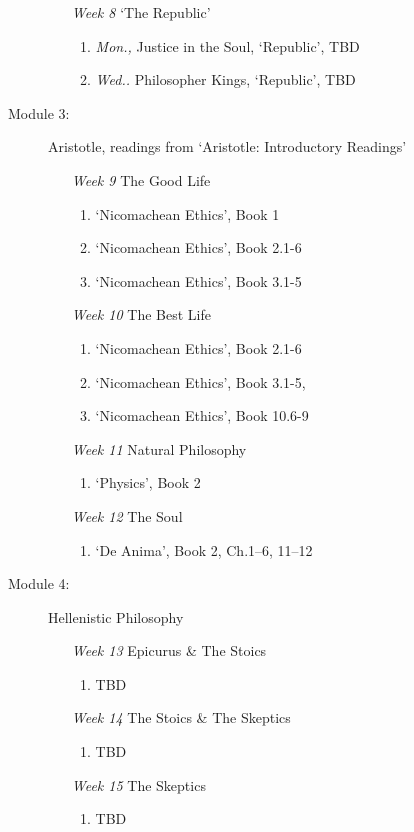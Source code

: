 \documentclass[article,oneside]{memoir}
\begin{document}
\begin{description}
\begin{enumerate}
\item[\textit{Week 8}] `The Republic'
\begin{enumerate}
\item \emph{Mon.,} Justice in the Soul, `Republic', TBD %
\item \emph{Wed..} Philosopher Kings, `Republic', TBD
\end{enumerate}
\end{enumerate}

\item[Module 3:] Aristotle, readings from `Aristotle: Introductory Readings'
\begin{enumerate}
\item[\textit{Week 9}]  The Good Life
\begin{enumerate}
\item `Nicomachean Ethics', Book 1
\item `Nicomachean Ethics', Book 2.1-6
\item `Nicomachean Ethics', Book 3.1-5 

\end{enumerate}
\item[\textit{Week 10}] The Best Life
\begin{enumerate}
\item `Nicomachean Ethics', Book 2.1-6
\item `Nicomachean Ethics', Book 3.1-5, 
\item `Nicomachean Ethics', Book 10.6-9

\end{enumerate}

\item[\textit{Week 11}] Natural Philosophy
\begin{enumerate}
\item `Physics', Book 2
\end{enumerate}
\item[\textit{Week 12}] The Soul
\begin{enumerate}
\item `De Anima', Book 2, Ch.1--6, 11--12
\end{enumerate}
\end{enumerate}

\item[Module 4:] Hellenistic Philosophy
\begin{enumerate}
\item[ \textit{Week 13}] Epicurus \& The Stoics
\begin{enumerate}
\item TBD
\end{enumerate}
\item[ \textit{Week 14}] The Stoics \& The Skeptics
\begin{enumerate}
\item TBD
\end{enumerate}
\item[\textit{Week 15}] The Skeptics
\begin{enumerate}
 \item TBD
\end{enumerate}

\end{enumerate}
\end{description}
\end{document}
